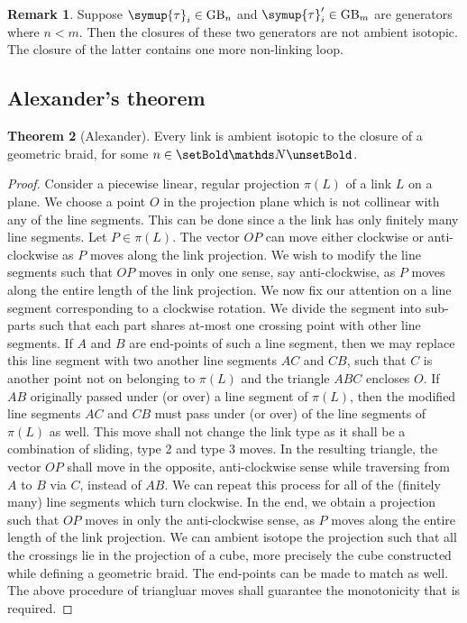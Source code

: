 \documentclass[oneside]{book}
\renewcommand{\symbb}[1]{\setBold \mathds #1 \unsetBold}
\newcommand{\GB}{\text{GB}}
\newcommand{\tauu}{\symup{\tau}}
\theoremstyle{definition}
\newtheorem{thm}{Theorem}
\newtheorem{remark}[thm]{Remark}
\begin{document}
	\begin{remark}
		Suppose \(\tauu_i \in \GB_n\) and \(\tauu_i' \in \GB_{m}\) are generators where \(n < m\). Then the closures of these two generators are not ambient isotopic. The closure of the latter contains one more non-linking loop.
	\end{remark}

	\subsection{Alexander's theorem}

	\begin{thm}[Alexander]
		Every link is ambient isotopic to the closure of a geometric braid, for some \(n \in \symbb{N}\).
	\end{thm}
	\begin{proof}
		Consider a piecewise linear, regular projection \(\pi(L)\) of a link \(L\) on a plane. We choose a point \(O\) in the projection plane which is not collinear with any of the line segments. This can be done since a the link has only finitely many line segments. Let \(P \in \pi(L)\). The vector \(OP\) can move either clockwise or anti-clockwise as \(P\) moves along the link projection. We wish to modify the line segments such that \(OP\) moves in only one sense, say anti-clockwise, as \(P\) moves along the entire length of the link projection. We now fix our attention on a line segment corresponding to a clockwise rotation. We divide the segment into sub-parts such that each part shares at-most one crossing point with other line segments. If \(A\) and \(B\) are end-points of such a line segment, then we may replace this line segment with two another line segments \(AC\) and \(CB\), such that \(C\) is another point not on belonging to \(\pi(L)\) and the triangle \(ABC\) encloses \(O\). If \(AB\) originally passed under (or over) a line segment of \(\pi(L)\), then the modified line segments \(AC\) and \(CB\) must pass under (or over) of the line segments of \(\pi(L)\) as well. This move shall not change the link type as it shall be a combination of sliding, type 2 and type 3 moves. In the resulting triangle, the vector \(OP\) shall move in the opposite, anti-clockwise sense while traversing from \(A\) to \(B\) via \(C\), instead of \(AB\). We can repeat this process for all of the (finitely many) line segments which turn clockwise. In the end, we obtain a projection such that \(OP\) moves in only the anti-clockwise sense, as \(P\) moves along the entire length of the link projection. We can ambient isotope the projection such that all the crossings lie in the projection of a cube, more precisely the cube constructed while defining a geometric braid. The end-points can be made to match as well. The above procedure of triangluar moves shall guarantee the monotonicity that is required.
	\end{proof}
\end{document}
